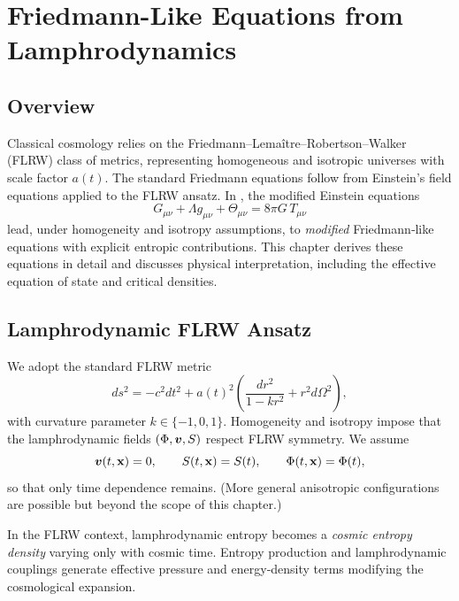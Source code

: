 
\chapter{Friedmann-Like Equations from Lamphrodynamics}
\label{chap:friedmann-like}

\section{Overview}

Classical cosmology relies on the Friedmann–Lemaître–Robertson–Walker
(FLRW) class of metrics, representing homogeneous and isotropic universes
with scale factor $a(t)$. The standard Friedmann equations follow from
Einstein’s field equations applied to the FLRW ansatz. In \rsvpabbr{}, the
modified Einstein equations
\[
  G_{\mu\nu} + \Lambda g_{\mu\nu} + \Theta_{\mu\nu} = 8\pi G\,T_{\mu\nu}
\]
lead, under homogeneity and isotropy assumptions, to \emph{modified}
Friedmann‐like equations with explicit entropic contributions. This chapter
derives these equations in detail and discusses physical interpretation,
including the effective equation of state and critical densities.

\section{Lamphrodynamic FLRW Ansatz}
\label{sec:flrw-ansatz}

We adopt the standard FLRW metric
\[
  ds^2 = -c^2dt^2 + a(t)^2\left(
    \frac{dr^2}{1 - kr^2} + r^2d\Omega^2
  \right),
\]
with curvature parameter $k\in\{-1,0,1\}$. Homogeneity and isotropy impose
that the lamphrodynamic fields $(\Phi,\bm{v},S)$ respect FLRW
symmetry. We assume
\[
  \bm{v}(t,\mathbf{x}) = 0,
\qquad
  S(t,\mathbf{x}) = S(t),
\qquad
  \Phi(t,\mathbf{x}) = \Phi(t),
\]
so that only time dependence remains. (More general anisotropic
configurations are possible but beyond the scope of this chapter.)

\begin{remark}
In the FLRW context, lamphrodynamic entropy becomes a \emph{cosmic entropy
density} varying only with cosmic time. Entropy production and lamphrodynamic
couplings generate effective pressure and energy‐density terms modifying the
cosmological expansion.
\end{remark}

